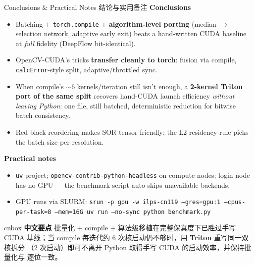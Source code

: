 \documentclass[aspectratio=169,10pt]{beamer}
\newcommand{\zh}[1]{{\zhfont #1}}
\newenvironment{cn}{%
  \begin{beamercolorbox}[rounded=true,sep=4pt,wd=\textwidth]{cnbox}\zhfont\footnotesize
  {\color{cblue!70!black}\textbf{中文要点}}\quad}%
  {\end{beamercolorbox}}
\begin{document}
\begin{frame}{Conclusions \& Practical Notes \zh{结论与实用备注}}
  \textbf{Conclusions}
  \begin{itemize}\itemsep0pt\small
    \item Batching $+$ \texttt{torch.compile} $+$ \textbf{algorithm-level
      porting} (median $\to$ selection network, adaptive early exit) beats a
      hand-written CUDA baseline at \emph{full} fidelity (DeepFlow
      bit-identical).
    \item OpenCV-CUDA's tricks \textbf{transfer cleanly to torch}: fusion via
      compile, \texttt{calcError}-style split, adaptive/throttled sync.
    \item When compile's $\sim$6 kernels/iteration still isn't enough, a
      \textbf{2-kernel Triton port of the same split} recovers hand-CUDA
      launch efficiency \emph{without leaving Python}: one file, still
      batched, deterministic reduction for bitwise batch consistency.
    \item Red-black reordering makes SOR tensor-friendly; the L2-residency
      rule picks the batch size per resolution.
  \end{itemize}
  \textbf{Practical notes}
  \begin{itemize}\itemsep0pt\small
    \item \texttt{uv} project; \texttt{opencv-contrib-python-headless} on
      compute nodes; login node has no GPU --- the benchmark script auto-skips
      unavailable backends.
    \item GPU runs via SLURM: {\scriptsize
      \texttt{srun -p gpu -w ilps-cn119 --gres=gpu:1 --cpus-per-task=8
      --mem=16G uv run --no-sync python benchmark.py}}
  \end{itemize}
  \vfill
  \begin{cn}
    批量化 + compile + 算法级移植在完整保真度下已胜过手写 CUDA 基线；当
    compile 每迭代约 6 次核启动仍不够时，用 \textbf{Triton} 重写同一双核拆分
    （2 次启动）即可不离开 Python 取得手写 CUDA 的启动效率，并保持批量化与
    逐位一致。
  \end{cn}
\end{frame}
\end{document}
